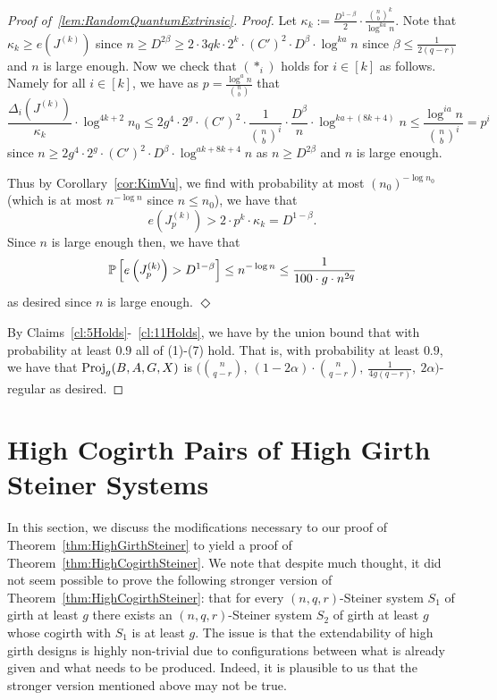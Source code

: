 \documentclass[11pt]{article}
\newcounter{i}
\theoremstyle{plain}
\newenvironment{proofclaim}[1][]%
{\noindent \emph{Proof.} {}{#1}{}}{\hfill
	$\Diamond$\vspace{1em}}
\renewcommand{\theclaim}{\thetheorem.\arabic{claim}}
\newenvironment{lateproof}[1]
 {%
  \renewcommand{\theclaim}{\ref{#1}.\arabic{claim}}%
  \begin{proof}[Proof of~\cref{#1}]%
 }
 {\end{proof}}
\theoremstyle{plain} %
\theoremstyle{definition}
\newcommand{\Prob}[1]{\ensuremath{%
\mathbb P\left[#1\right]
}}
\begin{document}
\begin{lateproof}{lem:RandomQuantumExtrinsic}
\begin{proofclaim}
Let $\kappa_k:= \frac{D^{1-\beta}}{2} \cdot \frac{\binom{n}{b}^k}{\log^{ka} n}$. Note that $\kappa_k\ge e\left(J^{(k)}\right)$ since $n \ge D^{2\beta} \ge 2\cdot 3qk\cdot 2^k\cdot (C')^2\cdot D^{\beta} \cdot \log^{ka} n$ since $\beta \le \frac{1}{2(q-r)}$ and $n$ is large enough. Now we check that $(*_i)$ holds for $i\in [k]$ as follows. Namely for all $i\in [k]$, we have as $p=\frac{\log^a n}{\binom{n}{b}}$ that
$$\frac{\Delta_i\left(J^{(k)}\right)}{\kappa_k}\cdot \log^{4k+2}n_0\le 2g^4\cdot 2^g\cdot (C')^2\cdot \frac{1}{\binom{n}{b}^i}\cdot \frac{D^{\beta}}{n} \cdot \log^{ka+(8k+4)}n \le \frac{\log^{ia} n}{\binom{n}{b}^i} = p^i$$ since $n \ge 2g^4\cdot 2^g\cdot (C')^2\cdot D^{\beta} \cdot \log^{ak+8k+4} n$ as $n\ge D^{2\beta}$ and $n$ is large enough. 

Thus by Corollary~\ref{cor:KimVu}, we find with probability at most
$(n_0)^{-\log n_0}$ (which is at most $n^{-\log n}$ since $n\le n_0$), we have that
$$e\left(J^{(k)}_p\right) > 2\cdot p^k\cdot \kappa_k = D^{1-\beta}.$$ 
Since $n$ is large enough then, we have that
$$\Prob{e\left(J^{(k)}_p\right) > D^{1-\beta} }\le n^{-\log n} \le  \frac{1}{100\cdot g\cdot n^{2q}}$$
as desired since $n$ is large enough.\end{proofclaim}

By Claims~\ref{cl:5Holds}-~\ref{cl:11Holds}, we have by the union bound that with probability at least $0.9$ all of (1)-(7) hold. That is, with probability at least $0.9$, we have that ${\rm Proj}_g(B,A,G,X)$ is $\bigg(\binom{n}{q-r},~(1-2\alpha) \cdot \binom{n}{q-r},~\frac{1}{4g(q-r)},~2\alpha\bigg)$-regular as desired.
\end{lateproof}

\section{High Cogirth Pairs of High Girth Steiner Systems}\label{s:CogirthPair}

In this section, we discuss the modifications necessary to our proof of Theorem~\ref{thm:HighGirthSteiner} to yield a proof of Theorem~\ref{thm:HighCogirthSteiner}. We note that despite much thought, it did not seem possible to prove the following stronger version of Theorem~\ref{thm:HighCogirthSteiner}: that for every $(n,q,r)$-Steiner system $S_1$ of girth at least $g$ there exists an $(n,q,r)$-Steiner system $S_2$ of girth at least $g$ whose cogirth with $S_1$ is at least $g$. The issue is that the extendability of high girth designs is highly non-trivial due to configurations between what is already given and what needs to be produced. Indeed, it is plausible to us that the stronger version mentioned above may not be true. 
\end{document}
